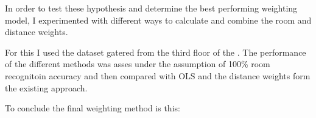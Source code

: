 In order to test these hypothesis and determine the best performing weighting model, I experimented with different ways to calculate and combine the room and distance weights.

For this I used the dataset gatered from the third floor of the . The performance of the different methods was asses under the assumption of 100\% room recognitoin accuracy and then compared with OLS and the distance weights form the existing approach.


To conclude the final weighting method is this:


